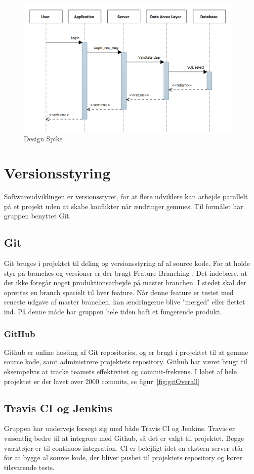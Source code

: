 \begin{figure}
	\centering
	\includegraphics[width=0.8\linewidth]{figs/processProjektGennemforsel/Spike.PNG}
	\caption{Design Spike}
	\label{fig:design_spike}
\end{figure}

\section{Versionsstyring}
Softwareudviklingen er versionsstyret, for at flere udviklere kan arbejde parallelt på et projekt uden at skabe konflikter når ændringer gemmes. Til formålet har gruppen benyttet Git.

\subsection{Git}
Git bruges i projektet til deling og versionsstyring af al source kode.
For at holde styr på branches og versioner er der brugt Feature Branching \cite{atlassian2016}. Det indebære, at der ikke foregår noget produktionsarbejde på master branchen. I stedet skal der oprettes en branch specielt til hver feature. Når denne feature er testet med seneste udgave af master branchen, kan ændringerne blive "merged" eller flettet ind. På denne måde har gruppen hele tiden haft et fungerende produkt.

\subsubsection{GitHub}
Github er online hosting af Git repositories, og er brugt i projektet til at gemme source kode, samt administrere projektets repository. Github har været brugt til eksempelvis at tracke teamets effektivitet og commit-frekvens. I løbet af hele projektet er der lavet over 2000 commits, se figur~\ref{fig:gitOverall}

\subsection{Travis CI og Jenkins} 
Gruppen har undervejs forsøgt sig med både Travis CI og Jenkins. Travis er væsentlig bedre til at integrere med Github, så det er valgt til projektet.
Begge værktøjer er til continuos integration. CI er belejligt idet en ekstern server står for at bygge al source kode, der bliver pushet til projektets repository og kører tilsvarende tests.

